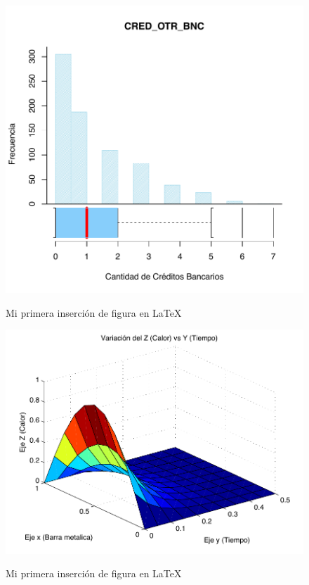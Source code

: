 \documentclass[a4paper, 11pt]{article}
\begin{document}
        \begin{figure}[ht]
            \centering
            \caption{Mi primera inserción de figura en \LaTeX}
            \includegraphics[scale = 1]{04_ENTORNOS_FLOTANTES/images/mifigura.pdf}
            \label{fig: minifigura.pdf}
        \end{figure}
        
        \begin{figure}[ht]
            \centering
            \caption{Mi primera inserción de figura en \LaTeX}
            \includegraphics[width = 0.7\linewidth, clip = true, trim = 1.5cm 1cm 0cm 1cm]{04_ENTORNOS_FLOTANTES/images/Grafica3D.pdf}
            \label{fig: Graficaaa}
        \end{figure}
\end{document}

